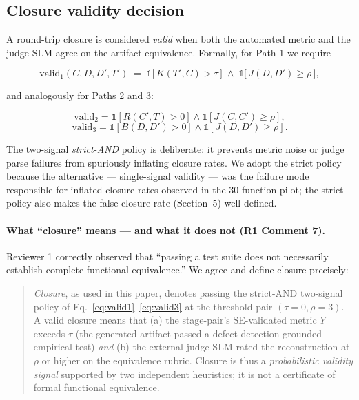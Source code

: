 \subsection{Closure validity decision}

A round-trip closure is considered \emph{valid} when both the automated metric and the judge SLM agree on the artifact equivalence. Formally, for Path 1 we require

\begin{equation}
  \text{valid}_1(C, D, D', T')
  \;=\;
  \mathds{1}\!\bigl[\, K(T', C) > \tau \,\bigr]
  \;\wedge\;
  \mathds{1}\!\bigl[\, J(D, D') \geq \rho \,\bigr],
  \label{eq:valid1}
\end{equation}

and analogously for Paths 2 and 3:

\begin{equation}
  \text{valid}_2 = \mathds{1}[R(C', T) > 0] \wedge \mathds{1}[J(C, C') \geq \rho],
  \label{eq:valid2}
\end{equation}
\begin{equation}
  \text{valid}_3 = \mathds{1}[B(D, D') > 0] \wedge \mathds{1}[J(D, D') \geq \rho].
  \label{eq:valid3}
\end{equation}

The two-signal \emph{strict-AND} policy is deliberate: it prevents metric noise or judge parse failures from spuriously inflating closure rates. We adopt the strict policy because the alternative --- single-signal validity --- was the failure mode responsible for inflated closure rates observed in the 30-function pilot; the strict policy also makes the false-closure rate (Section~5) well-defined.

\paragraph{What ``closure'' means --- and what it does not (R1 Comment 7).}
Reviewer 1 correctly observed that ``passing a test suite does not necessarily establish complete functional equivalence.'' We agree and define closure precisely:

\begin{quote}
\emph{Closure}, as used in this paper, denotes passing the strict-AND two-signal policy of Eq.~\ref{eq:valid1}--\ref{eq:valid3} at the threshold pair $(\tau = 0, \rho = 3)$. A valid closure means that (a) the stage-pair's SE-validated metric $Y$ exceeds $\tau$ (the generated artifact passed a defect-detection-grounded empirical test) \emph{and} (b) the external judge SLM rated the reconstruction at $\rho$ or higher on the equivalence rubric. Closure is thus a \emph{probabilistic validity signal} supported by two independent heuristics; it is not a certificate of formal functional equivalence.
\end{quote}

